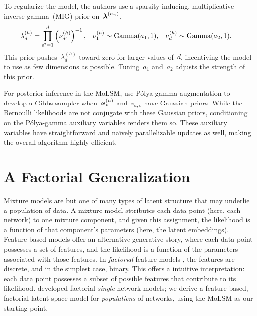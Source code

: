 To regularize the model, the authors use a sparsity-inducing, multiplicative
inverse gamma~(MIG) prior on~$\boldsymbol{\lambda}^{(h_n)}$,
\begin{align}
  \lambda_d^{(h)} &= \prod_{d'=1}^d \left(\nu_{d'}^{(h)} \right)^{-1}, &
  \nu_1^{(h)} &\sim \mathrm{Gamma}(a_1, 1), &
  \nu_d^{(h)} &\sim \mathrm{Gamma}(a_2, 1).
\end{align}
This prior pushes~$\lambda_d^{(h)}$ toward zero
for larger values of~$d$, incentiving the model to use
as few dimensions as possible. Tuning~$a_1$ and~$a_2$ adjusts
the strength of this prior.

For posterior inference in the MoLSM, \citet{durante2016nonparametric} use
P\'{o}lya-gamma augmentation to develop a Gibbs sampler 
when~$\boldsymbol{x}_v^{(h)}$ and~$z_{u,v}$ have Gaussian priors. 
While the Bernoulli likelihoods are not conjugate with these Gaussian
priors, conditioning on the P\'{o}lya-gamma auxiliary variables renders them so.
These auxiliary variables have straightforward and na\"{i}vely parallelizable
updates as well, making the overall algorithm highly efficient.

\section{A Factorial Generalization}
Mixture models are but one of many types of latent structure that may
underlie a population of data.  A mixture model attributes each data point
(here, each network) to one mixture component, and given
this assignment, the likelihood is a function of that component's
parameters (here, the latent embeddings).  Feature-based models offer
an alternative generative story, where each data point possesses a
set of features, and the likelihood is a function of the parameters
associated with those features.  In \emph{factorial} feature models
\citep{ghahramani1995factorial, ghahramani1996factorial,
  meeds2007modeling, ghahramani2007bayesian}, the features are
discrete, and in the simplest case, binary.  This offers a intuitive
interpretation: each data point possesses a subset of possible features
that contribute to its likelihood.  \citet{miller2009nonparametric} developed
factorial \emph{single} network models;  we derive a feature
based, factorial latent space model for \emph{populations} of networks, using
the MoLSM as our starting point.

